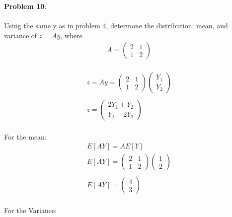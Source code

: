 \documentclass{exam}
\begin{document}
\pagebreak
\textbf{Problem 10}:\\
\\
Using the same y as in problem 4, determone the distribution. mean, and variance of $z = Ay$, where 
\\
\begin{equation}
\begin{gathered}
A = \begin{pmatrix} 2 & 1 \\ 1 & 2 \end{pmatrix} 
\end{gathered}
\end{equation}
\\
\begin{equation}
\begin{gathered}
z = Ay =  \begin{pmatrix} 2 & 1 \\ 1 & 2 \end{pmatrix}\begin{pmatrix} Y_1\\Y_2 \end{pmatrix}\\
\\
z = \begin{pmatrix} 2Y_1+Y_2\\Y_1+2Y_2 \end{pmatrix}
\end{gathered}
\end{equation}
\\
For the mean: 
\begin{equation}
\begin{gathered}
E[AY] = AE[Y]\\
E[AY] = \begin{pmatrix} 2 & 1 \\ 1 & 2 \end{pmatrix}\begin{pmatrix} 1\\2 \end{pmatrix}\\
\\
E[AY] = \begin{pmatrix} 4\\3 \end{pmatrix}
\end{gathered}
\end{equation}
\\
For the Variance:
\end{document}

